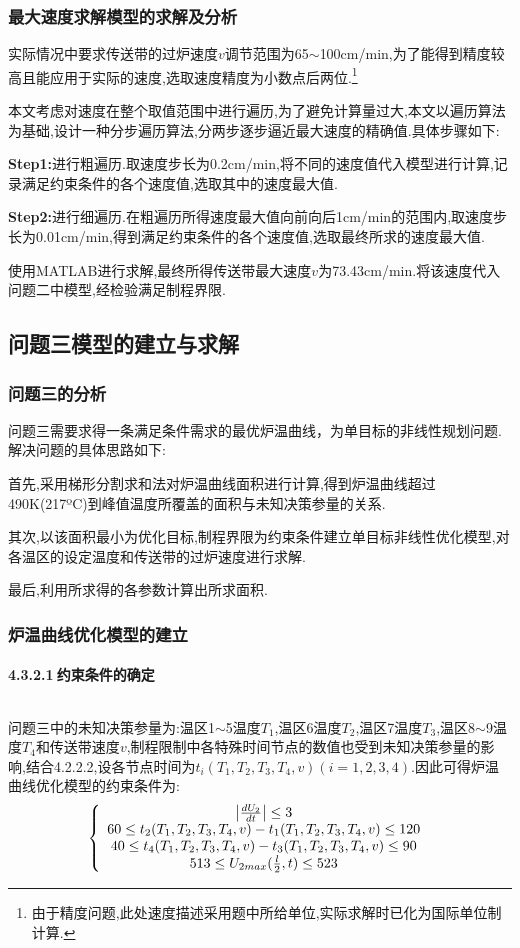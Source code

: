 \documentclass[12pt]{ctexart}
\numberwithin{figure}{section}
\numberwithin{table}{section}
\begin{document}
\subsubsection{最大速度求解模型的求解及分析}
实际情况中要求传送带的过炉速度$v$调节范围为65$\sim$100cm/min,为了能得到精度较高且能应用于实际的速度,选取速度精度为小数点后两位.\footnote{由于精度问题,此处速度描述采用题中所给单位,实际求解时已化为国际单位制计算.}

本文考虑对速度在整个取值范围中进行遍历,为了避免计算量过大,本文以遍历算法为基础,设计一种分步遍历算法,分两步逐步逼近最大速度的精确值.具体步骤如下:

\textbf{Step1:}进行粗遍历.取速度步长为0.2cm/min,将不同的速度值代入模型进行计算,记录满足约束条件的各个速度值,选取其中的速度最大值.

\textbf{Step2:}进行细遍历.在粗遍历所得速度最大值向前向后1cm/min的范围内,取速度步长为0.01cm/min,得到满足约束条件的各个速度值,选取最终所求的速度最大值.

使用MATLAB进行求解,最终所得传送带最大速度$v$为73.43cm/min.将该速度代入问题二中模型,经检验满足制程界限.
\newpage

\subsection{问题三模型的建立与求解}
\subsubsection{问题三的分析}
问题三需要求得一条满足条件需求的最优炉温曲线，为单目标的非线性规划问题.解决问题的具体思路如下:

首先,采用梯形分割求和法对炉温曲线面积进行计算,得到炉温曲线超过490K(217ºC)到峰值温度所覆盖的面积与未知决策参量的关系.

其次,以该面积最小为优化目标,制程界限为约束条件建立单目标非线性优化模型,对各温区的设定温度和传送带的过炉速度进行求解.

最后,利用所求得的各参数计算出所求面积.
\subsubsection{炉温曲线优化模型的建立}
\paragraph{4.3.2.1$\ $约束条件的确定}$\ $

问题三中的未知决策参量为:温区1$\sim$5温度$T_1$,温区6温度$T_2$,温区7温度$T_3$,温区8$\sim$9温度$T_4$和传送带速度$v$,制程限制中各特殊时间节点的数值也受到未知决策参量的影响,结合4.2.2.2,设各节点时间为$t_i(T_1,T_2,T_3,T_4,v)(i=1,2,3,4)$.因此可得炉温曲线优化模型的约束条件为:
\begin{equation}
\left\{
\begin{array}{cc}

\left|\frac{d U_2}{d t}\right|\leq3\\
60\leq t_2(T_1,T_2,T_3,T_4,v)-t_1(T_1,T_2,T_3,T_4,v)\leq120\\
40\leq t_4(T_1,T_2,T_3,T_4,v)-t_3(T_1,T_2,T_3,T_4,v)\leq90\\
513\leq U_{2max}(\frac{l}{2},t)\leq523
\end{array}\right. \\
\end{equation}
\end{document}
